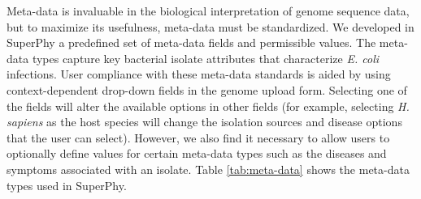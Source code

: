 \documentclass[a4paper,twoside]{article}
\begin{document}
{Meta-data is invaluable in the biological interpretation of genome sequence data, but to maximize its usefulness, meta-data must be standardized. We developed in SuperPhy a predefined set of meta-data fields and permissible values. The meta-data types capture key bacterial isolate attributes that characterize \textit{E. coli} infections. User compliance with these meta-data standards is aided by using context-dependent drop-down fields in the genome upload form. Selecting one of the fields will alter the available options in other fields (for example, selecting \textit{H. sapiens} as the host species will change the isolation sources and disease options that the user can select).  However, we also find it necessary to allow users to optionally define values for certain meta-data types such as the diseases and symptoms associated with an isolate. Table \ref{tab:meta-data} shows the meta-data types used in SuperPhy.

}
\end{document}
